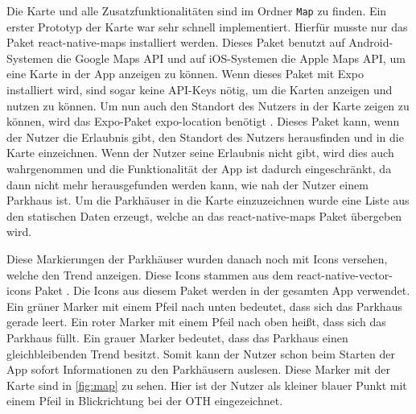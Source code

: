 Die Karte und alle Zusatzfunktionalitäten sind im Ordner \verb|Map| zu finden. Ein erster Prototyp der Karte war sehr schnell implementiert. Hierfür musste nur das Paket react-native-maps installiert werden. Dieses Paket benutzt auf Android-Systemen die Google Maps API und auf iOS-Systemen die Apple Maps API, um eine Karte in der App anzeigen zu können. Wenn dieses Paket mit Expo installiert wird, sind sogar keine API-Keys nötig, um die Karten anzeigen und nutzen zu können. Um nun auch den Standort des Nutzers in der Karte zeigen zu können, wird das Expo-Paket expo-location benötigt \cite{location}. Dieses Paket kann, wenn der Nutzer die Erlaubnis gibt, den Standort des Nutzers herausfinden und in die Karte einzeichnen. Wenn der Nutzer seine Erlaubnis nicht gibt, wird dies auch wahrgenommen und die Funktionalität der App ist dadurch eingeschränkt, da dann nicht mehr herausgefunden werden kann, wie nah der Nutzer einem Parkhaus ist. Um die Parkhäuser in die Karte einzuzeichnen wurde eine Liste aus den statischen Daten erzeugt, welche an das react-native-maps Paket übergeben wird.

Diese Markierungen der Parkhäuser wurden danach noch mit Icons versehen, welche den Trend anzeigen. Diese Icons stammen aus dem react-native-vector-icons Paket \cite{vector-icons}. Die Icons aus diesem Paket werden in der gesamten App verwendet. Ein grüner Marker mit einem Pfeil nach unten bedeutet, dass sich das Parkhaus gerade leert. Ein roter Marker mit einem Pfeil nach oben heißt, dass sich das Parkhaus füllt. Ein grauer Marker bedeutet, dass das Parkhaus einen gleichbleibenden Trend besitzt. Somit kann der Nutzer schon beim Starten der App sofort Informationen zu den Parkhäusern auslesen. Diese Marker mit der Karte sind in \autoref{fig:map} zu sehen. Hier ist der Nutzer als kleiner blauer Punkt mit einem Pfeil in Blickrichtung bei der OTH eingezeichnet.

